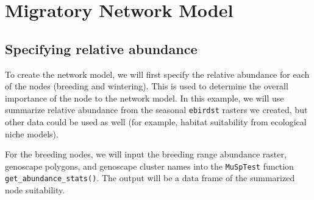 \documentclass[
]{book}
\newenvironment{Shaded}{\begin{snugshade}}{\end{snugshade}}
\newcommand{\AttributeTok}[1]{\textcolor[rgb]{0.77,0.63,0.00}{#1}}
\newcommand{\DocumentationTok}[1]{\textcolor[rgb]{0.56,0.35,0.01}{\textbf{\textit{#1}}}}
\newcommand{\FunctionTok}[1]{\textcolor[rgb]{0.00,0.00,0.00}{#1}}
\newcommand{\NormalTok}[1]{#1}
\newcommand{\OtherTok}[1]{\textcolor[rgb]{0.56,0.35,0.01}{#1}}
\newcommand{\SpecialCharTok}[1]{\textcolor[rgb]{0.00,0.00,0.00}{#1}}
\newcommand{\StringTok}[1]{\textcolor[rgb]{0.31,0.60,0.02}{#1}}
\begin{document}
\hypertarget{connectivity}{%
\chapter{Migratory Network Model}\label{connectivity}}

\hypertarget{specifying-relative-abundance}{%
\section{Specifying relative abundance}\label{specifying-relative-abundance}}

To create the network model, we will first specify the relative abundance for each of the nodes (breeding and wintering). This is used to determine the overall importance of the node to the network model. In this example, we will use summarize relative abundance from the seasonal \texttt{ebirdst} rasters we created, but other data could be used as well (for example, habitat suitability from ecological niche models).

For the breeding nodes, we will input the breeding range abundance raster, genoscape polygons, and genoscape cluster names into the \texttt{MuSpTest} function \texttt{get\_abundance\_stats()}. The output will be a data frame of the summarized node suitability.

\begin{Shaded}
\end{Shaded}
\end{document}
